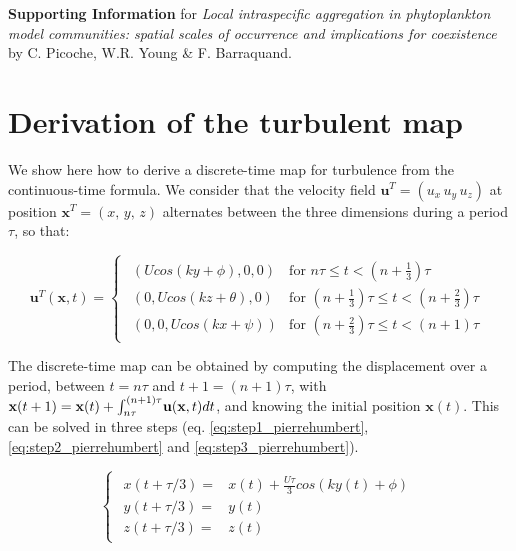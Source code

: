 \documentclass[english]{article}
\date{}
\begin{document}
\textbf{Supporting Information} for \textit{Local intraspecific aggregation
in phytoplankton model communities: spatial scales of occurrence and
implications for coexistence}\emph{ }by C. Picoche, W.R. Young \&
F. Barraquand.

\renewcommand\thesection{S\arabic{section}}
\setcounter{section}{0}
\renewcommand\thefigure{S\arabic{figure}}
\setcounter{figure}{0}
\renewcommand\theequation{S\arabic{equation}}
\setcounter{equation}{0}

\section{Derivation of the turbulent map}

We show here how to derive a discrete-time map for turbulence from
the continuous-time formula. We consider that the velocity field $\textbf{u}^{T}=(u_{x}\,u_{y}\,u_{z})$
at position $\mathbf{x}^{T}=(x,\,y,\,z)$ alternates between the three
dimensions during a period $\tau$, so that:

\begin{equation}
\textbf{u}^{T}(\textbf{x},t)=\begin{cases}
\begin{array}{cc}
\left(Ucos(ky+\phi),0,0\right) & \text{for }n\tau\leq t<(n+\frac{1}{3})\tau\\
\left(0,Ucos(kz+\theta),0\right) & \text{for }(n+\frac{1}{3})\tau\leq t<(n+\frac{2}{3})\tau\\
\left(0,0,Ucos(kx+\psi)\right) & \text{for }(n+\frac{2}{3})\tau\leq t<(n+1)\tau
\end{array}\end{cases}\label{eq:pierrehumber_continuous_time}
\end{equation}

The discrete-time map can be obtained by computing the displacement
over a period, between $t=n\tau$ and $t+1=(n+1)\tau$, with $\textbf{x}(t+1)=\textbf{x}(t)+\textbf{\ensuremath{\int_{n\tau}^{\left(n+1\right)\tau}}u}(\textbf{x},t)dt$,
and knowing the initial position $\mathbf{x}(t)$. This can be solved
in three steps (eq. \ref{eq:step1_pierrehumbert}, \ref{eq:step2_pierrehumbert}
and \ref{eq:step3_pierrehumbert}).

\begin{equation}
\begin{cases}
\begin{array}{cc}
x(t+\tau/3)= & x(t)+\frac{U\tau}{3}cos(ky(t)+\phi)\\
y(t+\tau/3)= & y(t)\\
z(t+\tau/3)= & z(t)
\end{array}\end{cases}\label{eq:step1_pierrehumbert}
\end{equation}
\end{document}
